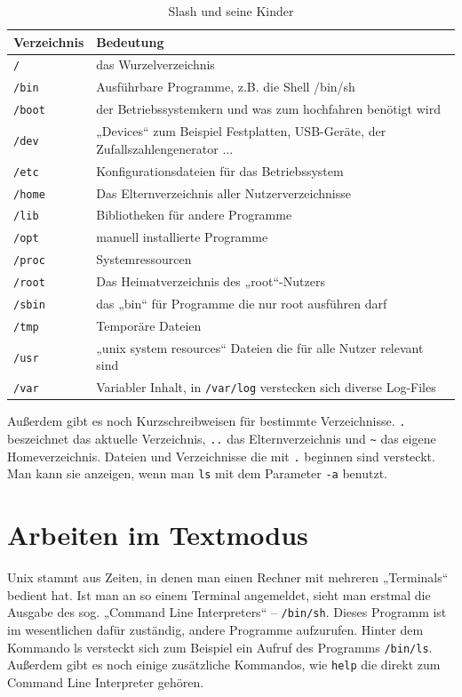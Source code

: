 \begin{table}
\centering
\begin{tabular}{l|l}
Verzeichnis & Bedeutung \\ \hline
\lstinline$/$ & das Wurzelverzeichnis \\
\lstinline$/bin$ & Ausführbare Programme, z.B. die Shell /bin/sh \\
\lstinline$/boot$ & der Betriebssystemkern und was zum hochfahren benötigt wird \\
\lstinline$/dev$ & „Devices“ zum Beispiel Festplatten, USB-Geräte, der Zufallszahlengenerator ...\\
\lstinline$/etc$ & Konfigurationsdateien für das Betriebssystem \\
\lstinline$/home$ & Das Elternverzeichnis aller Nutzerverzeichnisse \\
\lstinline$/lib$ & Bibliotheken für andere Programme \\
\lstinline$/opt$ & manuell installierte Programme \\
\lstinline$/proc$ & Systemressourcen \\
\lstinline$/root$ & Das Heimatverzeichnis des „root“-Nutzers \\
\lstinline$/sbin$ & das „bin“ für Programme die nur root ausführen darf \\
\lstinline$/tmp$ & Temporäre Dateien \\
\lstinline$/usr$ & „unix system resources“ Dateien die für alle Nutzer relevant sind \\
\lstinline$/var$ & Variabler Inhalt, in \lstinline$/var/log$ verstecken sich diverse Log-Files
\end{tabular}
\caption{Slash und seine Kinder}
\label{UNIX-Verzeichnisse}
\end{table}

Außerdem gibt es noch Kurzschreibweisen für bestimmte Verzeichnisse. \lstinline$.$ beszeichnet das aktuelle Verzeichnis, \lstinline$..$ das Elternverzeichnis und \lstinline$~$ das eigene Homeverzeichnis.
Dateien und Verzeichnisse die mit \lstinline$.$ beginnen sind versteckt. Man kann sie anzeigen, wenn man \lstinline$ls$ mit dem Parameter \lstinline$-a$ benutzt.

\section{Arbeiten im Textmodus}
Unix stammt aus Zeiten, in denen man einen Rechner mit mehreren „Terminals“ bedient hat. 
Ist man an so einem Terminal angemeldet, sieht man erstmal die Ausgabe des sog. „Command Line Interpreters“ – \lstinline$/bin/sh$.
Dieses Programm ist im wesentlichen dafür zuständig, andere Programme aufzurufen. Hinter dem Kommando ls versteckt sich zum Beispiel ein Aufruf des Programms \lstinline$/bin/ls$. Außerdem gibt es noch einige zusätzliche Kommandos, wie \lstinline$help$ die direkt zum Command Line Interpreter gehören. 

